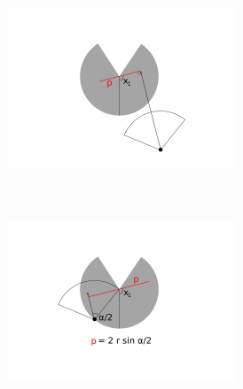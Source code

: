 \documentclass[a4paper,10pt,reqno,oneside]{amsart}
\begin{document}
\begin{figure}[t]
        \centering
	\begin{subfigure}[t]{60mm}
                \centering
		\includegraphics[width=60mm, trim= 6cm 2cm 6cm 0.3cm]{imgs/x1.pdf}
                \caption{}
                \label{f:xOne}
        \end{subfigure}%
	~ 
	\begin{subfigure}[t]{60mm}
                \centering
		\includegraphics[width=60mm, trim= 6cm 2cm 6cm 4cm]{imgs/firstIntegral.pdf}
                \caption{}
                \label{f:firstInt}
        \end{subfigure}%
	 

\end{figure}
\end{document}
